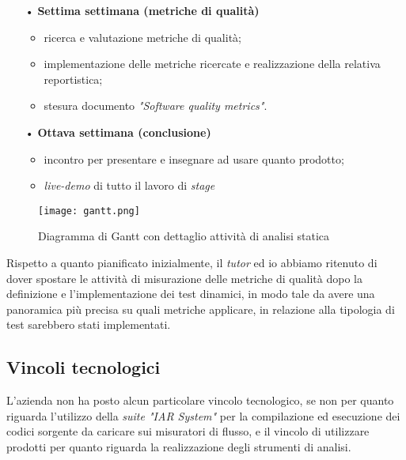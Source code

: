 \begin{itemize}
\item[•] \textbf{Settima settimana (metriche di qualità)}
	\begin{itemize}
	\item ricerca e valutazione metriche di qualità;
	\item implementazione delle metriche ricercate e realizzazione della relativa reportistica;
	\item stesura documento \textit{"Software quality metrics"}.
	\end{itemize}

\item[•] \textbf{Ottava settimana (conclusione)}
	\begin{itemize}
		\item incontro per presentare e insegnare ad usare quanto prodotto;
		\item \textit{live-demo} di tutto il lavoro di \textit{stage}

	\end{itemize}
\end{itemize}

\begin{figure}[H]
  \centering
  \texttt{[image: gantt.png]}
  \caption{Diagramma di Gantt con dettaglio attività di analisi statica}
\end{figure}

Rispetto a quanto pianificato inizialmente, il \textit{tutor} ed io abbiamo ritenuto di dover spostare le attività di misurazione delle metriche di qualità dopo la definizione e l'implementazione dei test dinamici, in modo tale da avere una panoramica più precisa su quali metriche applicare, in relazione alla tipologia di test sarebbero stati implementati.

\subsection{Vincoli tecnologici}
L'azienda non ha posto alcun particolare vincolo tecnologico, se non per quanto riguarda l'utilizzo della \textit{suite "IAR System"} per la compilazione ed esecuzione dei codici sorgente da caricare sui misuratori di flusso, e il vincolo di utilizzare prodotti \textit{} per quanto riguarda la realizzazione degli strumenti di analisi.

